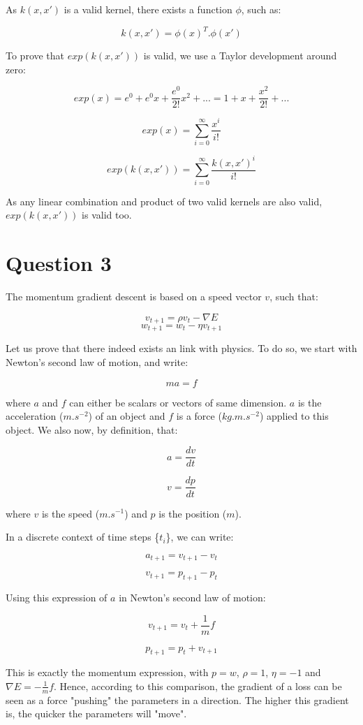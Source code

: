 \documentclass{article}
\begin{document}
As $k(x,x')$ is a valid kernel, there exists a function $\phi$, such as:

$$k(x,x') = \phi(x)^T.\phi(x')$$

To prove that $exp(k(x,x'))$ is valid, we use a Taylor development around zero:

$$exp(x) = e^0 + e^0 x + \frac{e^0}{2!} x^2 + ... = 1 + x + \frac{x^2}{2!} + ...$$

$$exp(x) = \sum_{i=0}^\infty {\frac{x^i}{i!}}$$

$$exp(k(x,x')) = \sum_{i=0}^\infty {\frac{k(x,x')^i}{i!}}$$

As any linear combination and product of two valid kernels are also valid, $exp(k(x,x'))$ is valid too.

\section*{Question 3}

The momentum gradient descent is based on a speed vector $v$, such that:

$$ v_{t+1} = \rho v_t - \nabla E $$
$$ w_{t+1} = w_t - \eta v_{t+1} $$

Let us prove that there indeed exists an link with physics. To do so, we start with Newton's second law of motion, and write:

$$ ma = f$$

where $a$ and $f$ can either be scalars or vectors of same dimension. $a$ is the acceleration ($m.s^{-2}$) of an object and $f$ is a force ($kg.m.s^{-2}$) applied to this object. We also now, by definition, that:

$$ a = \frac{dv}{dt}$$

$$ v = \frac{dp}{dt}$$

where $v$ is the speed ($m.s^{-1}$) and $p$ is the position ($m$).

In a discrete context of time steps \{$t_i$\}, we can write:

$$ a_{t+1} = v_{t+1} - v_{t}$$

$$ v_{t+1} = p_{t+1} - p_{t}$$

Using this expression of $a$ in Newton's second law of motion:

$$ v_{t+1} = v_{t} + \frac{1}{m} f $$

$$ p_{t+1} = p_{t} + v_{t+1} $$

This is exactly the momentum expression, with $p=w$, $\rho=1$, $\eta=-1$ and $\nabla E = -\frac{1}{m} f$. Hence, according to this comparison, the gradient of a loss can be seen as a force "pushing" the parameters in a direction. The higher this gradient is, the quicker the parameters will "move".
\end{document}
